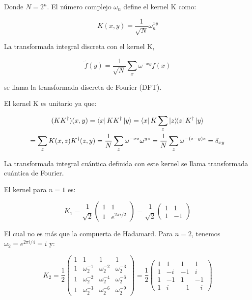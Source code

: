 Donde $N = 2^n$. El número complejo $\omega_n$ define el kernel K como:

\begin{equation}
    K(x,y) = \frac{1}{\sqrt{N}} \omega_n^{x y}
\end{equation}

La transformada integral discreta con el kernel K,

\begin{equation}
    \tilde{f}(y) = \frac{1}{\sqrt{N}} \sum\limits_x \omega^{-x y} f(x)
\end{equation}

se llama la transformada discreta de Fourier (DFT).

El kernel K es unitario ya que:

\begin{multline}
    (K K^\dagger)(x,y) = \bra{x} K K^\dagger \ket{y}
    = \bra{x} K \sum\limits_z \ketbra{z}{z} K^\dagger \ket{y} \\
    = \sum\limits_z K(x,z) K^\dagger(z,y) 
    = \frac{1}{N} \sum\limits_z \omega^{-x z} \omega^{y z} 
    = \frac{1}{N} \sum\limits_z \omega^{- (z-y) z} 
    = \delta_{x y}
\end{multline}

La transformada integral cuántica definida con este kernel se llama transformada cuántica de Fourier.

El kernel para $n = 1$ es:

\begin{equation}
    K_1 = \frac{1}{\sqrt{2}}
    \begin{pmatrix}
        1 & 1 \\
        1 & e^{2\pi i/2}
    \end{pmatrix} =
    \frac{1}{\sqrt{2}}
    \begin{pmatrix}
        1 & 1 \\
        1 & -1
    \end{pmatrix}
\end{equation}

El cual no es más que la compuerta de Hadamard. Para $n = 2$, tenemos $\omega_2 = e^{2\pi i/4} = i$ y:

\begin{equation}
    K_2 = \frac{1}{2}
    \begin{pmatrix}
        1 & 1 & 1 & 1 \\
        1 & \omega_2^{-1} & \omega_2^{-2} & \omega_2^{-3} \\
        1 & \omega_2^{-2} & \omega_2^{-4} & \omega_2^{-6} \\
        1 & \omega_2^{-3} & \omega_2^{-6} & \omega_2^{-9}
    \end{pmatrix} =
    \frac{1}{2}
    \begin{pmatrix}
        1 & 1 & 1 & 1 \\
        1 & -i & -1 & i \\
        1 & -1 & 1 & -1 \\
        1 & i & -1 & -i
    \end{pmatrix}
\end{equation}

